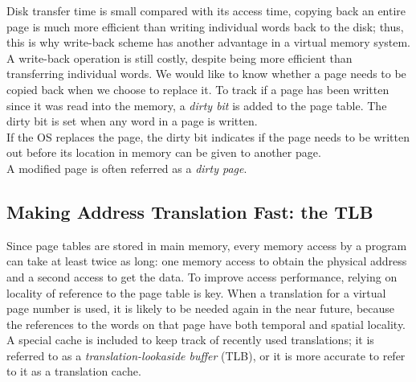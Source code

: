 \documentclass[12pt]{article}
\theoremstyle{definition}
\begin{document}
  Disk transfer time is small compared with its access time, copying back an entire page is much more efficient than writing individual words back to the disk;
  thus, this is why write-back scheme has another advantage in a virtual memory system. \\
  A write-back operation is still costly, despite being more efficient than transferring individual words.
  We would like to know whether a page needs to be copied back when we choose to replace it.
  To track if a page has been written since it was read into the memory, a \emph{dirty bit} is added to the page table.
  The dirty bit is set when any word in a page is written. \\
  If the OS replaces the page, the dirty bit indicates if the page needs to be written out before its location in memory can be given to another page. \\
  A modified page is often referred as a \emph{dirty page}.

  \subsection{Making Address Translation Fast: the TLB}
  Since page tables are stored in main memory, every memory access by a program can take at least twice as long: one memory access to obtain the physical address and a second access to get the data.
  To improve access performance, relying on locality of reference to the page table is key.
  When a translation for a virtual page number is used, it is likely to be needed again in the near future, because the references to the words on that page have both temporal and spatial locality. \\

  A special cache is included to keep track of recently used translations;
  it is referred to as a \emph{translation-lookaside buffer} (TLB), or it is more accurate to refer to it as a translation cache.

  \begin{figure}[H]
  \end{figure}
\end{document}
